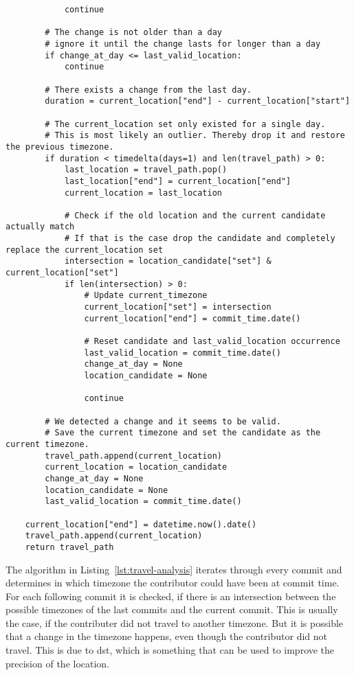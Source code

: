 \begin{verbatim}
            continue

        # The change is not older than a day
        # ignore it until the change lasts for longer than a day
        if change_at_day <= last_valid_location:
            continue

        # There exists a change from the last day.
        duration = current_location["end"] - current_location["start"]

        # The current_location set only existed for a single day.
        # This is most likely an outlier. Thereby drop it and restore the previous timezone.
        if duration < timedelta(days=1) and len(travel_path) > 0:
            last_location = travel_path.pop()
            last_location["end"] = current_location["end"]
            current_location = last_location

            # Check if the old location and the current candidate actually match
            # If that is the case drop the candidate and completely replace the current_location set
            intersection = location_candidate["set"] & current_location["set"]
            if len(intersection) > 0:
                # Update current_timezone
                current_location["set"] = intersection
                current_location["end"] = commit_time.date()

                # Reset candidate and last_valid_location occurrence
                last_valid_location = commit_time.date()
                change_at_day = None
                location_candidate = None

                continue

        # We detected a change and it seems to be valid.
        # Save the current timezone and set the candidate as the current timezone.
        travel_path.append(current_location)
        current_location = location_candidate
        change_at_day = None
        location_candidate = None
        last_valid_location = commit_time.date()

    current_location["end"] = datetime.now().date()
    travel_path.append(current_location)
    return travel_path
\end{verbatim}
\begingroup
{}\label{lst:travel-analysis}
\endgroup

The algorithm in Listing~\ref{lst:travel-analysis} iterates through every commit and determines in which timezone the contributor could have been at commit time.
For each following commit it is checked, if there is an intersection between the possible timezones of the last commits and the current commit.
This is usually the case, if the contributer did not travel to another timezone.
But it is possible that a change in the timezone happens, even though the contributor did not travel.
This is due to \ac{dst}, which is something that can be used to improve the precision of the location.

